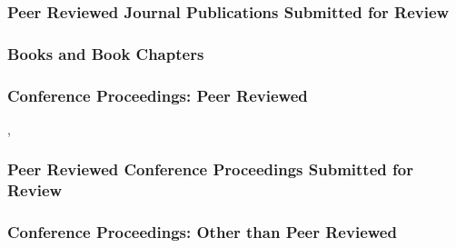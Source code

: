 
\subsubsection{Peer Reviewed Journal Publications Submitted for Review}

\subsubsection{Books and Book Chapters}

\subsubsection{Conference Proceedings: Peer Reviewed}

\begin{conferencebib}
\item {}, 
\end{conferencebib}


\subsubsection*{Peer Reviewed Conference Proceedings Submitted for Review}


\subsubsection{Conference Proceedings: Other than Peer Reviewed}


